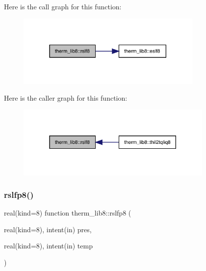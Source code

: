 Here is the call graph for this function\+:
\nopagebreak
\begin{figure}[H]
\begin{center}
\leavevmode
\includegraphics[width=258pt]{namespacetherm__lib8_ae2428f5fab9f3796e437eee297f7972b_cgraph}
\end{center}
\end{figure}
Here is the caller graph for this function\+:
\nopagebreak
\begin{figure}[H]
\begin{center}
\leavevmode
\includegraphics[width=273pt]{namespacetherm__lib8_ae2428f5fab9f3796e437eee297f7972b_icgraph}
\end{center}
\end{figure}
\mbox{\label{namespacetherm__lib8_a73403657254241b151da2ab205ab477f}} 
\subsubsection{\texorpdfstring{rslfp8()}{rslfp8()}}
{\footnotesize\ttfamily real(kind=8) function therm\+\_\+lib8\+::rslfp8 (\begin{DoxyParamCaption}\item[{real(kind=8), intent(in)}]{pres,  }\item[{real(kind=8), intent(in)}]{temp }\end{DoxyParamCaption})}


